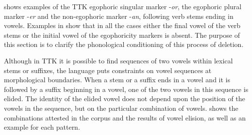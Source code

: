 \documentclass[output=paper]{langsci/langscibook}
\begin{document}
 shows examples of the TTK egophoric singular marker -\textit{or}, the egophoric plural marker -\textit{er} and the non-egophoric marker -\textit{an}, following verb stems ending in vowels. Examples in  show that in all the cases either the final vowel of the verb stems or the initial vowel of the egophoricity markers is absent. The purpose of this section is to clarify the phonological conditioning of this process of deletion.




Although in TTK it is possible to find sequences of two vowels within lexical stems or suffixes, the language puts constraints on vowel sequences at morphological boundaries. When a stem or a suffix ends in a vowel and it is followed by a suffix beginning in a vowel, one of the two vowels in this sequence is elided. The identity of the elided vowel does not depend upon the position of the vowels in the sequence, but on the particular combination of vowels.  shows the combinations attested in the corpus and the results of vowel elision, as well as an example for each pattern.
\end{document}
